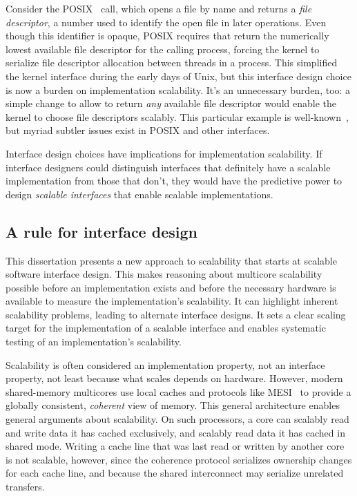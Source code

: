 Consider the POSIX~\cite{posix2013}  call, which opens a
file by name and returns a \emph{file descriptor}, a number used to
identify the open file in later operations.
%
Even though this identifier is opaque, POSIX requires that 
return the numerically lowest available file descriptor for the
calling process, forcing the kernel to serialize file descriptor
allocation between threads in a process.
%
This simplified the kernel interface during the early days of Unix,
but this interface design choice is now a burden on implementation
scalability.
%
It's an unnecessary burden, too: a simple change to allow 
to return \emph{any} available file descriptor would enable the kernel
to choose file descriptors scalably.
%
This particular example is well-known~\cite{boyd-wickizer:corey}, but
myriad subtler issues exist in POSIX and other interfaces.

Interface design choices have implications for implementation
scalability.
%
If interface designers could distinguish interfaces that definitely
have a scalable implementation from those that don't, they would have
the predictive power to design \emph{scalable interfaces} that enable
scalable implementations.


\subsection{A rule for interface design}

This dissertation presents a new approach to scalability that starts
at scalable software interface design.
%
This makes reasoning about multicore scalability possible before an
implementation exists and before the necessary hardware is available
to measure the implementation's scalability.
%
It can highlight inherent scalability problems, leading to alternate
interface designs.
%
It sets a clear scaling target for the implementation of a
scalable interface and enables systematic testing of an
implementation's scalability.

Scalability is often considered an implementation property, not an
interface property, not least because what scales depends on hardware.
%
However, modern shared-memory multicores use local caches and
protocols like MESI~\cite{papamarcos:mesi} to provide a globally
consistent, \emph{coherent} view of memory.  This general architecture
enables general arguments about scalability.
%
On such processors, a core can scalably read and write data it has
cached exclusively, and scalably read data it has cached in shared
mode. Writing a cache line that was last read or written by another
core is not scalable, however, since the coherence protocol serializes
ownership changes for each cache line, and because the shared
interconnect may serialize unrelated transfers.

